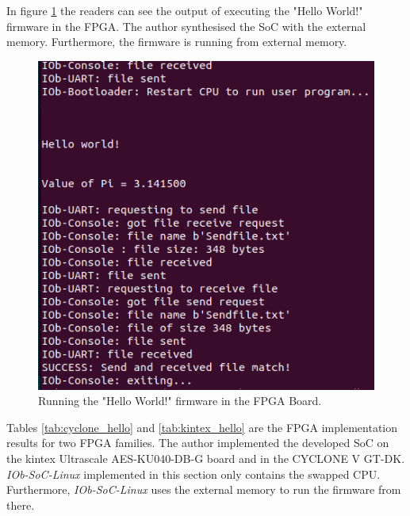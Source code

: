 In figure \ref{fig:hello_fpga} the readers can see the output of executing the "Hello World!" firmware in the FPGA. The author synthesised the SoC with the external memory. Furthermore, the firmware is running from external memory.

\begin{figure}[!ht]
    \centering
    \includegraphics[width=\linewidth]{../images/end_hello_fpga.png}
    \caption{Running the "Hello World!" firmware in the FPGA Board.}
    \label{fig:hello_fpga}
\end{figure}

Tables \ref{tab:cyclone_hello} and \ref{tab:kintex_hello} are the FPGA implementation results for two FPGA families. The author implemented the developed SoC on the kintex Ultrascale AES-KU040-DB-G board and in the CYCLONE V GT-DK. \textit{IOb-SoC-Linux} implemented in this section only contains the swapped CPU. Furthermore, \textit{IOb-SoC-Linux} uses the external memory to run the firmware from there.

